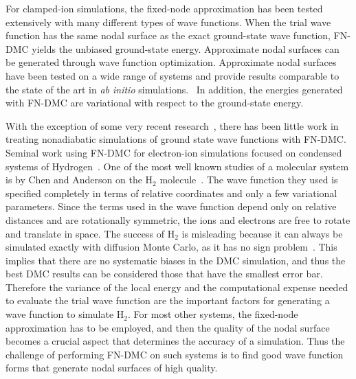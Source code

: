 \documentclass[aip,jcp,numerical,reprint]{revtex4-1}
\begin{document}
For clamped-ion simulations, the fixed-node approximation has been tested extensively with many different types of wave functions.  When the trial wave function has the same nodal surface as the exact ground-state wave function, FN-DMC yields the unbiased ground-state energy.  Approximate nodal surfaces can be generated through wave function optimization.  Approximate nodal surfaces have been tested on a wide range of systems and provide results comparable to the state of the art in \textit{ab initio} simulations.~\cite{Stuart_Review,rothstein1,grossman1,Yang2015,Tubman_Release} In addition, the energies generated with FN-DMC are variational with respect to the ground-state energy.


With the exception of some very recent research~\cite{Tubman_ECG,Yang2015}, there has been little work in treating nonadiabatic simulations of ground state wave functions with FN-DMC. Seminal work using FN-DMC for electron-ion simulations focused on condensed systems of Hydrogen~\cite{Ceperley_1987,Natoli_1993,Natoli_1995}.  One of the most well known studies of a molecular system is by Chen and Anderson   on  the H$_{2}$ molecule~\cite{chen1995}. %
  The wave function they used is specified completely in terms of relative coordinates and only a few variational parameters. Since the terms used in the wave function depend only on relative distances and are rotationally symmetric, the ions and electrons are free to rotate and translate in space. 
The success of H$_{2}$ is misleading because it can always be simulated exactly with diffusion Monte Carlo, as it has no sign problem~\cite{Tubman_Release}.  This implies that there are no systematic biases in the DMC simulation, and thus the best DMC results can be considered those that have the smallest error bar.  Therefore the variance of the local energy and the computational expense needed to evaluate the trial wave function are the important factors for generating a wave function to simulate H$_{2}$.  For most other systems, the fixed-node approximation has to be employed, and then the quality of the nodal surface becomes a crucial aspect that determines the accuracy of a simulation.  Thus the challenge of performing FN-DMC on such systems is to find good wave function forms that generate nodal surfaces of high quality.
\end{document}
